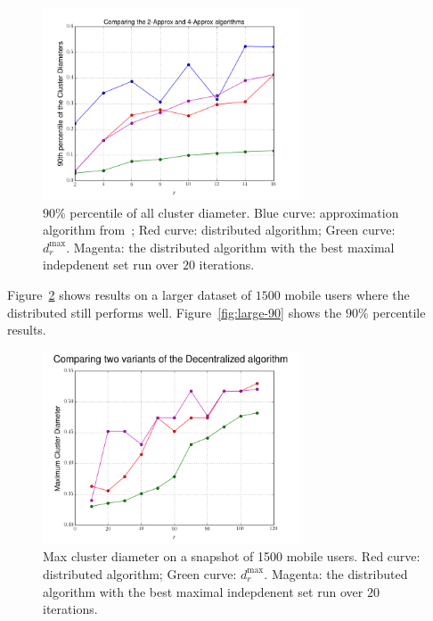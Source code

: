 \begin{figure}[h]
\begin{center}
\includegraphics[width=3in]{figs/90thpercentile_60Cars.png}
\caption{$90\%$ percentile of all cluster diameter. Blue curve: approximation algorithm from~\cite{Aggarwal06achievinganonymity}; Red curve: distributed algorithm; Green curve: $d_{r}^{\max}$. Magenta: the distributed algorithm with the best maximal indepdenent set run over $20$ iterations.}\label{fig:comparison-90}
\end{center}
\end{figure}

Figure~\ref{fig:large} shows results on a larger dataset of $1500$
mobile users where the distributed still performs well. Figure~\ref{fig:large-90} shows the $90\%$ percentile results.  


\begin{figure}[h]
\begin{center}
\includegraphics[width=3in]{figs/cars1500_4Approx.png}
\caption{Max cluster diameter on a snapshot of 1500 mobile users. Red curve: distributed algorithm; Green curve: $d_{r}^{\max}$. Magenta: the distributed algorithm with the best maximal indepdenent set run over $20$ iterations.}\label{fig:large}
\end{center}
\end{figure}

